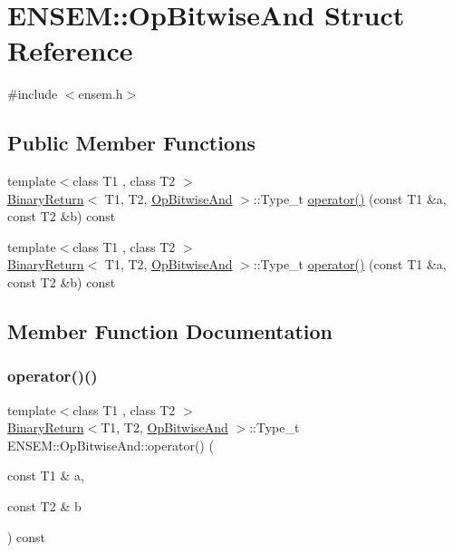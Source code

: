 \hypertarget{structENSEM_1_1OpBitwiseAnd}{}\section{E\+N\+S\+EM\+:\+:Op\+Bitwise\+And Struct Reference}
\label{structENSEM_1_1OpBitwiseAnd}


{\ttfamily \#include $<$ensem.\+h$>$}

\subsection*{Public Member Functions}
\begin{DoxyCompactItemize}
\item 
{\footnotesize template$<$class T1 , class T2 $>$ }\\\mbox{\hyperlink{structENSEM_1_1BinaryReturn}{Binary\+Return}}$<$ T1, T2, \mbox{\hyperlink{structENSEM_1_1OpBitwiseAnd}{Op\+Bitwise\+And}} $>$\+::Type\+\_\+t \mbox{\hyperlink{structENSEM_1_1OpBitwiseAnd_aa0d3491aacf78f315c39f90394d4fa86}{operator()}} (const T1 \&a, const T2 \&b) const
\item 
{\footnotesize template$<$class T1 , class T2 $>$ }\\\mbox{\hyperlink{structENSEM_1_1BinaryReturn}{Binary\+Return}}$<$ T1, T2, \mbox{\hyperlink{structENSEM_1_1OpBitwiseAnd}{Op\+Bitwise\+And}} $>$\+::Type\+\_\+t \mbox{\hyperlink{structENSEM_1_1OpBitwiseAnd_aa0d3491aacf78f315c39f90394d4fa86}{operator()}} (const T1 \&a, const T2 \&b) const
\end{DoxyCompactItemize}


\subsection{Member Function Documentation}
\mbox{\label{structENSEM_1_1OpBitwiseAnd_aa0d3491aacf78f315c39f90394d4fa86}} 
\subsubsection{\texorpdfstring{operator()()}{operator()()}\hspace{0.1cm}{\footnotesize\ttfamily [1/2]}}
{\footnotesize\ttfamily template$<$class T1 , class T2 $>$ \\
\mbox{\hyperlink{structENSEM_1_1BinaryReturn}{Binary\+Return}}$<$T1, T2, \mbox{\hyperlink{structENSEM_1_1OpBitwiseAnd}{Op\+Bitwise\+And}} $>$\+::Type\+\_\+t E\+N\+S\+E\+M\+::\+Op\+Bitwise\+And\+::operator() (\begin{DoxyParamCaption}\item[{const T1 \&}]{a,  }\item[{const T2 \&}]{b }\end{DoxyParamCaption}) const\hspace{0.3cm}{\ttfamily [inline]}}

